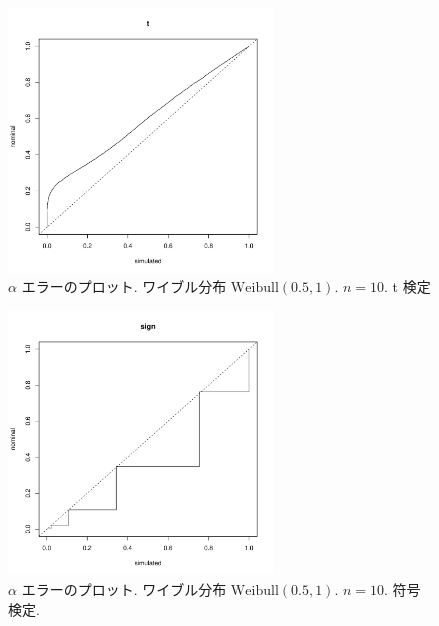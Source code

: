 \documentclass[12pt]{jsarticle}
\begin{document}
\begin{figure}[htbp]
  \begin{center}
\includegraphics[width=70mm]{img/pv_weibull_05_1_n10_t.pdf}
  \end{center}
     \caption{$\alpha$ エラーのプロット. ワイブル分布 $\mathrm{Weibull}(0.5,1)$. $n=10$. t 検定}
  \label{fig_pv_weibull_05_1_10_t}
 \end{figure}
 
 \begin{figure}[htbp]
 \begin{center}
  \includegraphics[width=70mm]{img/pv_weibull_05_1_n10_sign.pdf}
 \end{center}
      \caption{$\alpha$ エラーのプロット. ワイブル分布 $\mathrm{Weibull}(0.5,1)$. $n=10$. 符号検定.}
     \end{figure}  
\end{document}
